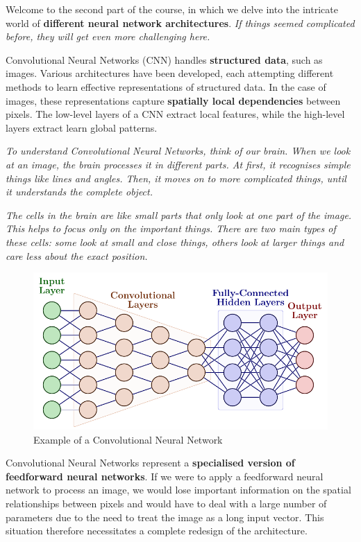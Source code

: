 Welcome to the second part of the course, in which we delve into the intricate world of \textbf{different neural network architectures}. \textit{If things seemed complicated before, they will get even more challenging here.} 

Convolutional Neural Networks (CNN) handles \textbf{structured data}, such as images. Various architectures have been developed, each attempting different methods to learn effective representations of structured data. In the case of images, these representations capture \textbf{spatially local dependencies} between pixels. The low-level layers of a CNN extract local features, while the high-level layers extract learn global
patterns.

\textit{To understand Convolutional Neural Networks, think of our brain. When we look at an image, the brain processes it in different parts. At first, it recognises simple things like lines and angles. Then, it moves on to more complicated things, until it understands the complete object.}

\textit{The cells in the brain are like small parts that only look at one part of the image. This helps to focus only on the important things. There are two main types of these cells: some look at small and close things, others look at larger things and care less about the exact position.}

\begin{figure}[!htbp]
    \centering
    \includegraphics[width=\textwidth]{tikz/chapter5 - CNN.pdf}
    \caption{Example of a Convolutional Neural Network}
\end{figure}

Convolutional Neural Networks represent a \textbf{specialised version of feedforward neural networks}. If we were to apply a feedforward neural network to process an image, we would lose important information on the spatial relationships between pixels and would have to deal with a large number of parameters due to the need to treat the image as a long input vector. This situation therefore necessitates a complete redesign of the architecture.

